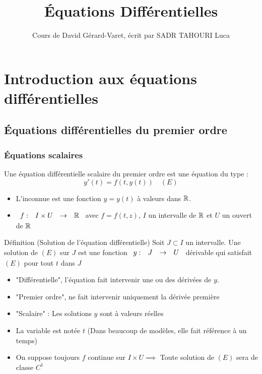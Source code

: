 \documentclass[]{report}
\title{Équations Différentielles}
\author{Cours de David Gérard-Varet, écrit par SADR TAHOURI Luca}
\date{}
\begin{document}
    \maketitle
    \tableofcontents

\chapter{Introduction aux équations différentielles}

\section{Équations différentielles du premier ordre}

\subsection{Équations scalaires}

\begin{df}{}{}
    Une équation différentielle scalaire du premier ordre est une équation du type :$$y'(t)=f(t,y(t)) \quad (E)$$
    \begin{itemize}
        \item L'inconnue est une fonction $y=y(t)$ à valeurs dans $\mathbb{R}$.
        \item $\begin{array}{ccccc} f : & I\times U & \to & \mathbb{R} \end{array}$ avec $f=f(t,z)$, $I$ un intervalle de $\mathbb{R}$ et $U$ un ouvert de $\mathbb{R}$
    \end{itemize}
\end{df}

\begin{df}{Définition (Solution de l'équation différentielle)}{}
    Soit $J\subset I$ un intervalle. Une solution de $(E)$ sur $J$ est une fonction $\begin{array}{ccccc} y : & J & \to & U \end{array}$ dérivable qui satisfait $(E)$ pour tout $t$ dans $J$
\end{df}

\begin{re}{}{}
    \begin{itemize}
        \item "Différentielle", l'équation fait intervenir une ou des dérivées de $y$.
        \item "Premier ordre", ne fait intervenir uniquement la dérivée première
        \item "Scalaire" : Les solutions $y$ sont à valeurs réelles
        \item La variable est notée $t$ (Dans beaucoup de modèles, elle fait référence à un temps)
        \item On suppose toujours $f$ continue sur $I\times U\implies$ Toute solution de $(E)$ sera de classe $C^1$
    \end{itemize}
\end{re}
\end{document}
